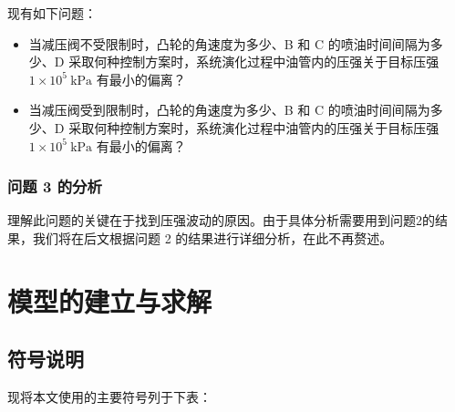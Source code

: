 \documentclass[withoutpreface,bwprint]{cumcmthesis}
\newcommand{\prb}{\times 10^5~\mathrm{kPa}}
\begin{document}
现有如下问题：

\begin{itemize}
	\item 当减压阀不受限制时，凸轮的角速度为多少、B 和 C 的喷油时间间隔为多少、D 采取何种控制方案时，系统演化过程中油管内的压强关于目标压强 $1\prb$ 有最小的偏离？
	\item 当减压阀受到限制时，凸轮的角速度为多少、B 和 C 的喷油时间间隔为多少、D 采取何种控制方案时，系统演化过程中油管内的压强关于目标压强 $1\prb$ 有最小的偏离？
\end{itemize}

\subsubsection{问题 3 的分析}
理解此问题的关键在于找到压强波动的原因。由于具体分析需要用到问题2的结果，我们将在后文根据问题 2 的结果进行详细分析，在此不再赘述。

\newpage
\section{模型的建立与求解}
\subsection{符号说明}

现将本文使用的主要符号列于下表：
\end{document}
